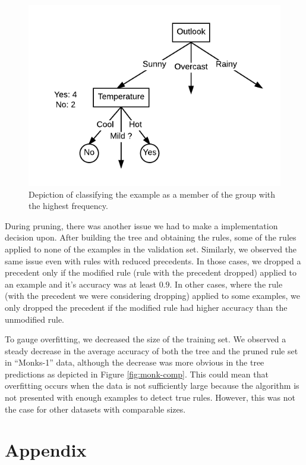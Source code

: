 \documentclass[12pt]{article}
\begin{document}
\begin{figure}[H]
  \centering
  \includegraphics[scale=0.5]{img/majority_voting}
  \caption{Depiction of classifying the example as a member of the group with the highest frequency.}
  \label{fig:majority-vote}
\end{figure}

During pruning, there was another issue we had to make a
implementation decision upon. After building the tree and obtaining
the rules, some of the rules applied to none of the examples in the
validation set. Similarly, we observed the same issue even with rules
with reduced precedents. In those cases, we dropped a precedent only
if the modified rule (rule with the precedent dropped) applied to an
example and it's accuracy was at least $0.9$. In other cases, where the
rule (with the precedent we were considering dropping) applied to some
examples, we only dropped the precedent if the modified rule had
higher accuracy than the unmodified rule.

To gauge overfitting, we decreased the size of the training set. We
observed a steady decrease in the average accuracy of both the tree
and the pruned rule set in ``Monks-1'' data, although the decrease was
more obvious in the tree predictions as depicted in Figure \ref{fig:monk-comp}. This could mean that
overfitting occurs when the data is not sufficiently large because the
algorithm is not presented with enough examples to detect true
rules. However, this was not the case for other datasets with
comparable sizes.

\section{Appendix}
\end{document}
